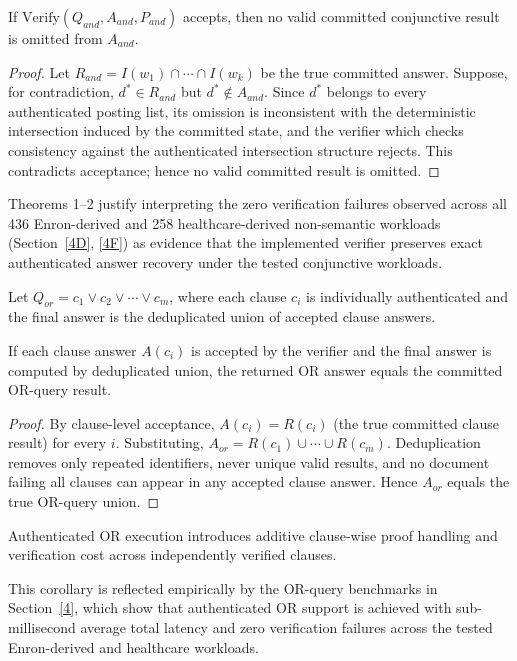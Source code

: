 \begin{theorem}
If $\mathrm{Verify}(Q_{and},A_{and},P_{and})$ accepts, then no valid committed conjunctive result is omitted from $A_{and}$.
\end{theorem}
\begin{proof}
Let $R_{and}=I(w_1)\cap\cdots\cap I(w_k)$ be the true committed answer. Suppose, for contradiction, $d^*\in R_{and}$ but $d^*\notin A_{and}$. Since $d^*$ belongs to every authenticated posting list, its omission is inconsistent with the deterministic intersection induced by the committed state, and the verifier which checks consistency against the authenticated intersection structure rejects. This contradicts acceptance; hence no valid committed result is omitted.
\end{proof}

Theorems 1--2 justify interpreting the zero verification failures observed across all 436 Enron-derived and 258 healthcare-derived non-semantic workloads (Section~\ref{4D}, \ref{4F}) as evidence that the implemented verifier preserves exact authenticated answer recovery under the tested conjunctive workloads.

\begin{definition}
Let $Q_{or}=c_1\lor c_2\lor\cdots\lor c_m$, where each clause $c_i$ is individually authenticated and the final answer is the deduplicated union of accepted clause answers.
\end{definition}

\begin{theorem}
If each clause answer $A(c_i)$ is accepted by the verifier and the final answer is computed by deduplicated union, the returned OR answer equals the committed OR-query result.
\end{theorem}
\begin{proof}
By clause-level acceptance, $A(c_i)=R(c_i)$ (the true committed clause result) for every $i$. Substituting, $A_{or}=R(c_1)\cup\cdots\cup R(c_m)$. Deduplication removes only repeated identifiers, never unique valid results, and no document failing all clauses can appear in any accepted clause answer. Hence $A_{or}$ equals the true OR-query union.
\end{proof}

\begin{corollary}
Authenticated OR execution introduces additive clause-wise proof handling and verification cost across independently verified clauses.
\end{corollary}
This corollary is reflected empirically by the OR-query benchmarks in Section~\ref{4}, which show that authenticated OR support is achieved with sub-millisecond average total latency and zero verification failures across the tested Enron-derived and healthcare workloads.

